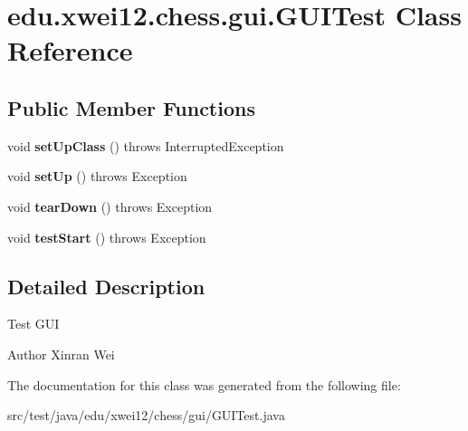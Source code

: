 \hypertarget{classedu_1_1xwei12_1_1chess_1_1gui_1_1_g_u_i_test}{}\section{edu.\+xwei12.\+chess.\+gui.\+G\+U\+I\+Test Class Reference}
\label{classedu_1_1xwei12_1_1chess_1_1gui_1_1_g_u_i_test}
\subsection*{Public Member Functions}
\begin{DoxyCompactItemize}
\item 
void {\bfseries set\+Up\+Class} ()  throws Interrupted\+Exception \hypertarget{classedu_1_1xwei12_1_1chess_1_1gui_1_1_g_u_i_test_a43357bf4e3193d4e9d250fa44ce43c8d}{}\label{classedu_1_1xwei12_1_1chess_1_1gui_1_1_g_u_i_test_a43357bf4e3193d4e9d250fa44ce43c8d}

\item 
void {\bfseries set\+Up} ()  throws Exception \hypertarget{classedu_1_1xwei12_1_1chess_1_1gui_1_1_g_u_i_test_ada470a6970547d07ae5d64fd76890a76}{}\label{classedu_1_1xwei12_1_1chess_1_1gui_1_1_g_u_i_test_ada470a6970547d07ae5d64fd76890a76}

\item 
void {\bfseries tear\+Down} ()  throws Exception \hypertarget{classedu_1_1xwei12_1_1chess_1_1gui_1_1_g_u_i_test_ad9b722cd977c3fcbe239345b6864ab0d}{}\label{classedu_1_1xwei12_1_1chess_1_1gui_1_1_g_u_i_test_ad9b722cd977c3fcbe239345b6864ab0d}

\item 
void {\bfseries test\+Start} ()  throws Exception \hypertarget{classedu_1_1xwei12_1_1chess_1_1gui_1_1_g_u_i_test_a0c0101bbf2cb04db0fcd467a24962750}{}\label{classedu_1_1xwei12_1_1chess_1_1gui_1_1_g_u_i_test_a0c0101bbf2cb04db0fcd467a24962750}

\end{DoxyCompactItemize}


\subsection{Detailed Description}
Test G\+UI \begin{DoxyAuthor}{Author}
Xinran Wei 
\end{DoxyAuthor}


The documentation for this class was generated from the following file\+:\begin{DoxyCompactItemize}
\item 
src/test/java/edu/xwei12/chess/gui/G\+U\+I\+Test.\+java\end{DoxyCompactItemize}
